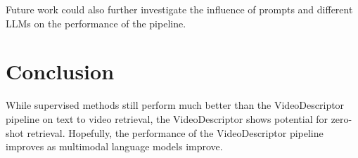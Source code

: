 \documentclass{article}
\begin{document}
Future work could also further investigate the influence of prompts and different LLMs on the performance of the pipeline.

\section{Conclusion}

While supervised methods still perform much better than the VideoDescriptor pipeline on text to video retrieval, the VideoDescriptor shows potential for zero-shot retrieval.
Hopefully, the performance of the VideoDescriptor pipeline improves as multimodal language models improve.



\end{document}
